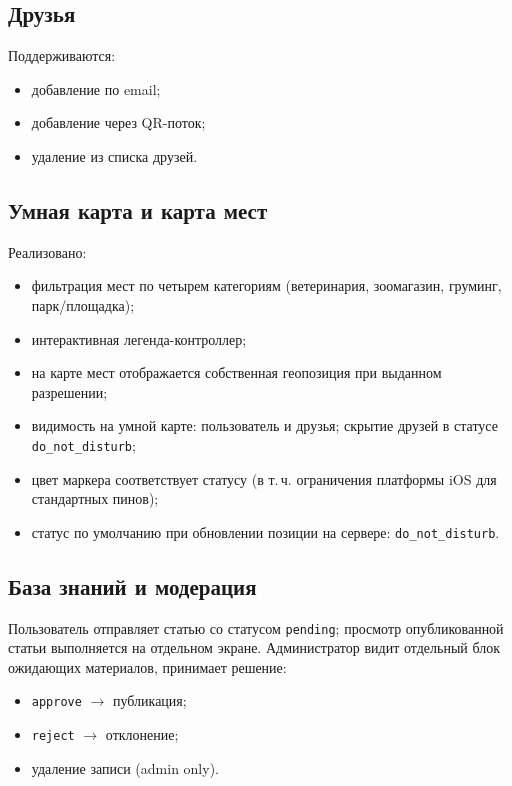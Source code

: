 \documentclass[12pt,a4paper]{article}
\newcommand{\code}[1]{{\small\texttt{#1}}}
\begin{document}
\subsection{Друзья}

Поддерживаются:
\begin{itemize}
  \item добавление по email;
  \item добавление через QR-поток;
  \item удаление из списка друзей.
\end{itemize}

\subsection{Умная карта и карта мест}

Реализовано:
\begin{itemize}
  \item фильтрация мест по четырем категориям (ветеринария, зоомагазин, груминг, парк/площадка);
  \item интерактивная легенда-контроллер;
  \item на карте мест отображается собственная геопозиция при выданном разрешении;
  \item видимость на умной карте: пользователь и друзья; скрытие друзей в статусе \code{do\_not\_disturb};
  \item цвет маркера соответствует статусу (в т.\,ч. ограничения платформы iOS для стандартных пинов);
  \item статус по умолчанию при обновлении позиции на сервере: \code{do\_not\_disturb}.
\end{itemize}

\subsection{База знаний и модерация}

Пользователь отправляет статью со статусом \code{pending}; просмотр опубликованной статьи выполняется на отдельном экране.  
Администратор видит отдельный блок ожидающих материалов, принимает решение:
\begin{itemize}
  \item \code{approve} $\rightarrow$ публикация;
  \item \code{reject} $\rightarrow$ отклонение;
  \item удаление записи (admin only).
\end{itemize}
\end{document}
